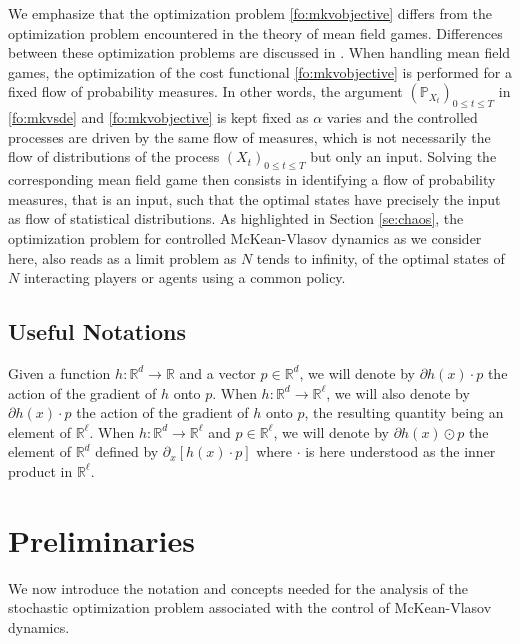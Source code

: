 \documentclass[11pt]{amsart}
\begin{document}
We emphasize that the optimization problem \eqref{fo:mkvobjective} differs from the optimization problem encountered in the theory of mean field games. Differences between these optimization problems are discussed in \cite{CarmonaDelarueLaChapelle}. When handling mean field games, the optimization of the cost functional \eqref{fo:mkvobjective} is performed for a fixed flow of probability measures. In other words, the argument $({\mathbb P}_{X_{t}})_{0 \leq t \leq T}$ in \eqref{fo:mkvsde}
and \eqref{fo:mkvobjective}
is kept fixed as $\alpha$ varies and the controlled processes are driven by the same flow of measures, which is not necessarily the flow of distributions of the process $(X_{t})_{0 \leq t \leq T}$ but only an input. Solving the corresponding mean field game then consists in identifying a flow of probability measures, that is an input, such that the optimal states have precisely the input as flow of statistical distributions. As highlighted in Section \ref{se:chaos}, the optimization problem for controlled McKean-Vlasov dynamics as we consider here, also reads as a limit problem as $N$ tends to infinity, of the optimal states of $N$ interacting players or agents using a common policy. 

\subsection*{Useful Notations} Given a function $h : {\mathbb R}^d \rightarrow {\mathbb R}$ and a vector $p \in {\mathbb R}^d$, we will denote by 
$\partial h(x) \cdot p$ the action of the gradient of $h$ onto $p$. When $h : {\mathbb R}^d \rightarrow {\mathbb R}^{\ell}$, we will also denote by 
$\partial h(x) \cdot p$ the action of the gradient of $h$ onto $p$, the resulting quantity being an element of ${\mathbb R}^{\ell}$. When  $h : {\mathbb R}^d \rightarrow {\mathbb R}^{\ell}$ and $p \in {\mathbb R}^{\ell}$, we will denote by $\partial h(x) \odot p$ the element of ${\mathbb R}^d$ defined by 
$\partial_{x} [ h(x) \cdot p]$ where $\cdot$ is here understood as the inner product in ${\mathbb R}^{\ell}$. 

\section{\textbf{Preliminaries}}
\label{se:preliminaries}
We now introduce the notation and concepts needed for the analysis of the stochastic optimization problem associated with the control of McKean-Vlasov dynamics.
\end{document}

